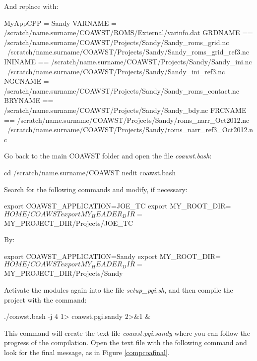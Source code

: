 \noindent And replace with:
\bigskip

\begin{bashcode}[fontsize=\footnotesize]
MyAppCPP = Sandy
VARNAME  = /scratch/name.surname/COAWST/ROMS/External/varinfo.dat
GRDNAME == /scratch/name.surname/COAWST/Projects/Sandy/Sandy_roms_grid.nc \
           /scratch/name.surname/COAWST/Projects/Sandy/Sandy_roms_grid_ref3.nc
ININAME == /scratch/name.surname/COAWST/Projects/Sandy/Sandy_ini.nc \
           /scratch/name.surname/COAWST/Projects/Sandy/Sandy_ini_ref3.nc
NGCNAME =  /scratch/name.surname/COAWST/Projects/Sandy/Sandy_roms_contact.nc
BRYNAME == /scratch/name.surname/COAWST/Projects/Sandy/Sandy_bdy.nc
FRCNAME == /scratch/name.surname/COAWST/Projects/Sandy/roms_narr_Oct2012.nc \
           /scratch/name.surname/COAWST/Projects/Sandy/roms_narr_ref3_Oct2012.nc
\end{bashcode}
\bigskip

\noindent Go back to the main COAWST folder and open the file \textit{coawst.bash}:
\bigskip

\begin{bashcode}
cd /scratch/name.surname/COAWST
nedit coawst.bash
\end{bashcode}
\bigskip

\noindent Search for the following commands and modify, if necessary:
\bigskip

\begin{bashcode}
export   COAWST_APPLICATION=JOE_TC
export   MY_ROOT_DIR=${HOME}/COAWST
export   MY_HEADER_DIR=${MY_PROJECT_DIR}/Projects/JOE_TC
\end{bashcode}
\bigskip

\noindent By:
\bigskip

\begin{bashcode}
export   COAWST_APPLICATION=Sandy
export   MY_ROOT_DIR=${HOME}/COAWST
export   MY_HEADER_DIR=${MY_PROJECT_DIR}/Projects/Sandy
\end{bashcode}
\bigskip

\noindent Activate the modules again into the file \textit{setup\_pgi.sh}, and then compile the project with the command:
\bigskip

\begin{bashcode}
./coawst.bash -j 4  1> coawst.pgi.sandy 2>&1 &
\end{bashcode}
\bigskip

\noindent This command will create the text file \textit{coawst.pgi.sandy} where you can follow the progress of the compilation. Open the text file with the following 
command and look for the final message, as in Figure \textcolor{bleu_cite}{\ref{compcoafinal}}.
\bigskip

